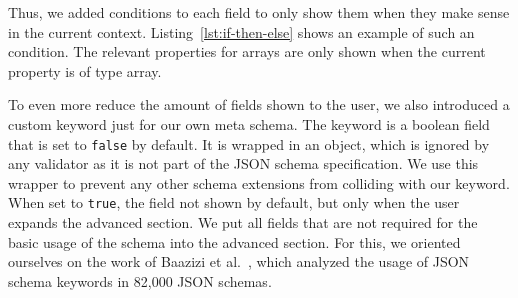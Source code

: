 Thus, we added  conditions to each field to only show them when they make sense in the current context.
Listing~\ref{lst:if-then-else} shows an example of such an  condition.
The relevant properties for arrays are only shown when the current property is of type array.

To even more reduce the amount of fields shown to the user, we also introduced a custom keyword just for our own meta schema.
The keyword  is a boolean field that is set to \texttt{false} by default.
It is wrapped in an  object, which is ignored by any validator as it is not part of the JSON schema specification.
We use this wrapper to prevent any other schema extensions from colliding with our keyword.
When set to \texttt{true}, the field not shown by default, but only when the user expands the advanced section.
We put all fields that are not required for the basic usage of the schema into the advanced section.
For this, we oriented ourselves on the work of Baazizi et al.~\cite{baazizi2021empirical}, which analyzed the usage of JSON schema keywords in 82,000 JSON schemas.




